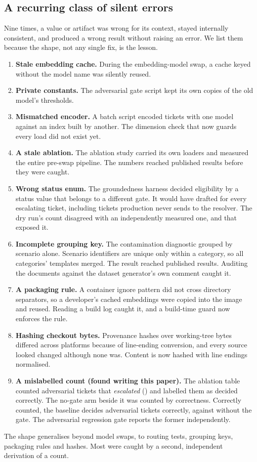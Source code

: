 \documentclass[conference,onecolumn,a4paper]{IEEEtran}
\begin{document}
\subsection{A recurring class of silent errors}
Nine times, a value or artifact was wrong for its context, stayed internally consistent, and produced a wrong result without raising an error. We list them because the shape, not any single fix, is the lesson.
\begin{enumerate}
\item \textbf{Stale embedding cache.} During the embedding-model swap, a cache keyed without the model name was silently reused.
\item \textbf{Private constants.} The adversarial gate script kept its own copies of the old model's thresholds.
\item \textbf{Mismatched encoder.} A batch script encoded tickets with one model against an index built by another. The dimension check that now guards every load did not exist yet.
\item \textbf{A stale ablation.} The ablation study carried its own loaders and measured the entire pre-swap pipeline. The numbers reached published results before they were caught.
\item \textbf{Wrong status enum.} The groundedness harness decided eligibility by a status value that belongs to a different gate. It would have drafted for every escalating ticket, including tickets production never sends to the resolver. The dry run's count disagreed with an independently measured one, and that exposed it.
\item \textbf{Incomplete grouping key.} The contamination diagnostic grouped by scenario alone. Scenario identifiers are unique only within a category, so all categories' templates merged. The result reached published results. Auditing the documents against the dataset generator's own comment caught it.
\item \textbf{A packaging rule.} A container ignore pattern did not cross directory separators, so a developer's cached embeddings were copied into the image and reused. Reading a build log caught it, and a build-time guard now enforces the rule.
\item \textbf{Hashing checkout bytes.} Provenance hashes over working-tree bytes differed across platforms because of line-ending conversion, and every source looked changed although none was. Content is now hashed with line endings normalised.
\item \textbf{A mislabelled count (found writing this paper).} The ablation table counted adversarial tickets that \emph{escalated} () and labelled them as decided correctly. The no-gate arm beside it was counted by correctness. Correctly counted, the baseline decides  adversarial tickets correctly, against  without the gate. The adversarial regression gate reports the former independently.
\end{enumerate}
The shape generalises beyond model swaps, to routing tests, grouping keys, packaging rules and hashes. Most were caught by a second, independent derivation of a count.
\end{document}
